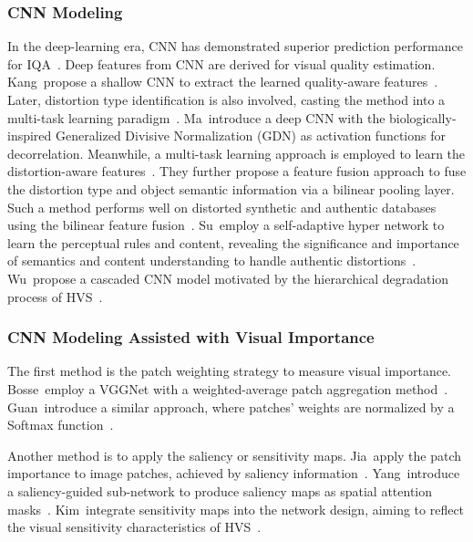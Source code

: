 	\subsubsection{CNN Modeling}
	In the deep-learning era, CNN has demonstrated superior prediction performance for IQA~\citep{kang2014convolutional, kang2015simultaneous, zhang2018blind, su2020blindly, wu2020end, tang2014blind, gu2017blind, talebi2018nima, zeng2017probabilistic}. Deep features from CNN are derived for visual quality estimation. Kang~\etal propose a shallow CNN to extract the learned quality-aware features~\citep{kang2014convolutional}. Later, distortion type identification is also involved, casting the method into a multi-task learning paradigm~\citep{kang2015simultaneous}. Ma~\etal introduce a deep CNN with the biologically-inspired Generalized Divisive Normalization (GDN) as activation functions for decorrelation. Meanwhile, a multi-task learning approach is employed to learn the distortion-aware features~\citep{ma2017end}. They further propose a feature fusion approach to fuse the distortion type and object semantic information via a bilinear pooling layer. Such a method performs well on distorted synthetic and authentic databases using the bilinear feature fusion~\citep{zhang2018blind}. Su~\etal employ a self-adaptive hyper network to learn the perceptual rules and content, revealing the significance and importance of semantics and content understanding to handle authentic distortions~\citep{su2020blindly}. Wu~\etal propose a cascaded CNN model motivated by the hierarchical degradation process of HVS~\citep{wu2020end}.
	
	\subsubsection{CNN Modeling Assisted with Visual Importance}
	The first method is the patch weighting strategy to measure visual importance. Bosse~\etal employ a VGGNet with a weighted-average patch aggregation method~\citep{bosse2016deep, bosse2017deep}. Guan~\etal introduce a similar approach, where patches' weights are normalized by a Softmax function~\citep{guan2017visual}. 
	
	Another method is to apply the saliency or sensitivity maps. Jia~\etal apply the patch importance to image patches, achieved by saliency information~\citep{jia2018saliency}. Yang~\etal introduce a saliency-guided sub-network to produce saliency maps as spatial attention masks~\citep{yang2019sgdnet}. Kim~\etal integrate sensitivity maps into the network design, aiming to reflect the visual sensitivity characteristics of HVS~\citep{kim2017deep}.
	
